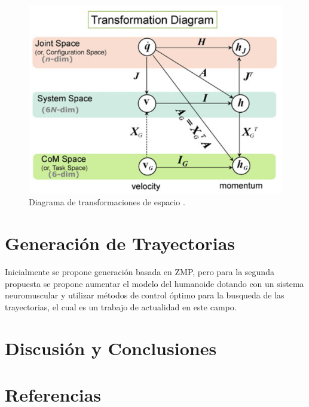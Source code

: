 \documentclass[journal,letterpaper,twoside,twocolumn]{IEEEtran}
\newcommand{\myreferences}{../../../doc/review/review/library}%
\begin{document}
\begin{figure}[!t]
  \centering
  \includegraphics[scale=0.3]{Orin2013TransformationDiagram.png}
  \caption{Diagrama de transformaciones de espacio \protect\cite{Orin2013}.}
  \label{fig:diagTransf}
\end{figure}

\section{Generación de Trayectorias}
\label{sec:genTray}
Inicialmente se propone generación basada en ZMP\cite{Chen2011,Or2010}, pero para la segunda propuesta se propone aumentar el modelo del humanoide dotando con un sistema neuromuscular y utilizar métodos de control óptimo para la busqueda de las trayectorias, el cual es un trabajo de actualidad en este campo\cite{Peng2017}. 

\section{Discusión y Conclusiones}
\label{sec:conclu}

\section{Referencias}
\label{sec:refs}

\end{document}
